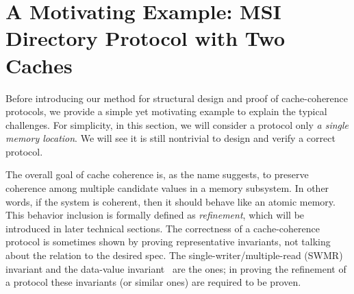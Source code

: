 \documentclass[sigplan,10pt,review,anonymous,screen]{acmart}\settopmatter{printfolios=true,printccs=false,printacmref=false}
\begin{document}

\section{A Motivating Example: MSI Directory Protocol with Two Caches}
\label{sec-example}

Before introducing our method for structural design and proof of cache-coherence protocols, we provide a simple yet motivating example to explain the typical challenges.
For simplicity, in this section, we will consider a protocol only \emph{a single memory location}.
We will see it is still nontrivial to design and verify a correct protocol.

The overall goal of cache coherence is, as the name suggests, to preserve coherence among multiple candidate values in a memory subsystem.
In other words, if the system is coherent, then it should behave like an atomic memory.
This behavior inclusion is formally defined as \emph{refinement}, which will be introduced in later technical sections.
The correctness of a cache-coherence protocol is sometimes shown by proving representative invariants, not talking about the relation to the desired spec.
The single-writer/multiple-read (SWMR) invariant and the data-value invariant~\cite{ccbook:2020} are the ones; in proving the refinement of a protocol these invariants (or similar ones) are required to be proven.
\end{document}
